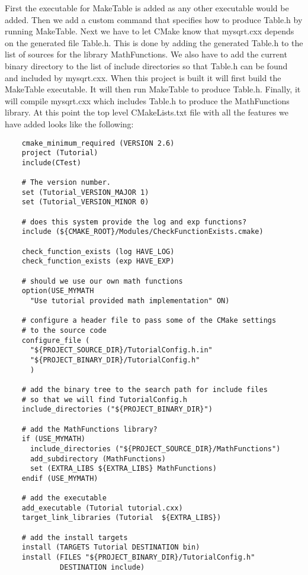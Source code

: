 \documentclass[UTF8,a4paper,8pt]{ctexart}
\begin{document}
	First the executable for MakeTable is added as any other executable would be added. Then we add a custom command that specifies how to produce Table.h by running MakeTable. Next we have to let CMake know that mysqrt.cxx depends on the generated file Table.h. This is done by adding the generated Table.h to the list of sources for the library MathFunctions. We also have to add the current binary directory to the list of include directories so that Table.h can be found and included by mysqrt.cxx. When this project is built it will first build the MakeTable executable. It will then run MakeTable to produce Table.h. Finally, it will compile mysqrt.cxx which includes Table.h to produce the MathFunctions library. At this point the top level CMakeLists.txt file with all the features we have added looks like the following:
	\begin{lstlisting}
	cmake_minimum_required (VERSION 2.6)
	project (Tutorial)
	include(CTest)
	 
	# The version number.
	set (Tutorial_VERSION_MAJOR 1)
	set (Tutorial_VERSION_MINOR 0)
	 
	# does this system provide the log and exp functions?
	include (${CMAKE_ROOT}/Modules/CheckFunctionExists.cmake)
	 
	check_function_exists (log HAVE_LOG)
	check_function_exists (exp HAVE_EXP)
	 
	# should we use our own math functions
	option(USE_MYMATH 
	  "Use tutorial provided math implementation" ON)
	 
	# configure a header file to pass some of the CMake settings
	# to the source code
	configure_file (
	  "${PROJECT_SOURCE_DIR}/TutorialConfig.h.in"
	  "${PROJECT_BINARY_DIR}/TutorialConfig.h"
	  )
	 
	# add the binary tree to the search path for include files
	# so that we will find TutorialConfig.h
	include_directories ("${PROJECT_BINARY_DIR}")
	 
	# add the MathFunctions library?
	if (USE_MYMATH)
	  include_directories ("${PROJECT_SOURCE_DIR}/MathFunctions")
	  add_subdirectory (MathFunctions)
	  set (EXTRA_LIBS ${EXTRA_LIBS} MathFunctions)
	endif (USE_MYMATH)
	 
	# add the executable
	add_executable (Tutorial tutorial.cxx)
	target_link_libraries (Tutorial  ${EXTRA_LIBS})
	 
	# add the install targets
	install (TARGETS Tutorial DESTINATION bin)
	install (FILES "${PROJECT_BINARY_DIR}/TutorialConfig.h"        
	         DESTINATION include)
	 

\end{lstlisting}
\end{document}
